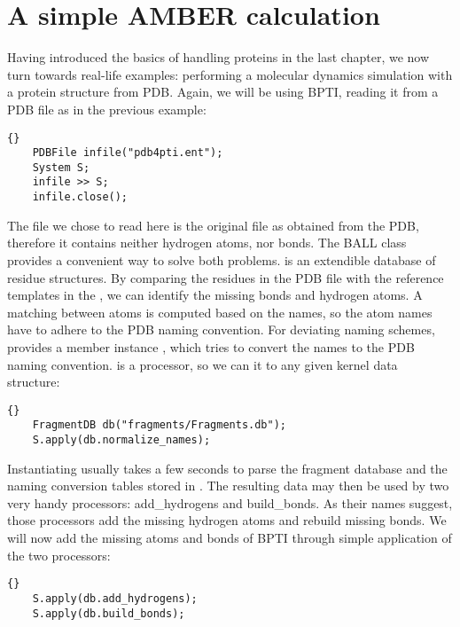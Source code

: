 \section{A simple AMBER calculation}


Having introduced the basics of handling proteins in the last chapter, we now
turn towards real-life examples: performing a molecular dynamics simulation
with a protein structure from PDB. Again, we will be using BPTI, reading it
from a PDB file as in the previous example:

\begin{lstlisting}{}
	PDBFile	infile("pdb4pti.ent");
	System S;
	infile >> S;
	infile.close();
\end{lstlisting}

\noindent
The file we chose to read here is the original file as obtained from
the PDB, therefore it contains neither hydrogen atoms, nor bonds.
The BALL class  provides a convenient way to solve
both problems.  is an extendible database of residue
structures. By comparing the residues in the PDB file with the reference
templates in the , we can identify the missing bonds
and hydrogen atoms. A matching between atoms is computed based on the names,
so the atom names have to adhere to the PDB naming convention.
For deviating naming schemes,  provides a member instance
, which tries to convert the names to the PDB 
naming convention.  is a processor, so we
can  it to any given kernel data structure:

\begin{lstlisting}{}
	FragmentDB db("fragments/Fragments.db");
	S.apply(db.normalize_names);
\end{lstlisting}

\noindent
Instantiating  usually takes a few seconds to parse the
fragment database and the naming conversion tables stored in
. The resulting data may then be used by two
very handy processors: add\_hydrogens and build\_bonds.
As their names suggest, those processors add the missing hydrogen atoms and
rebuild missing bonds. We will now add the missing atoms and bonds of BPTI 
through simple application of the two processors:

\begin{lstlisting}{}
	S.apply(db.add_hydrogens);
	S.apply(db.build_bonds);
\end{lstlisting}

